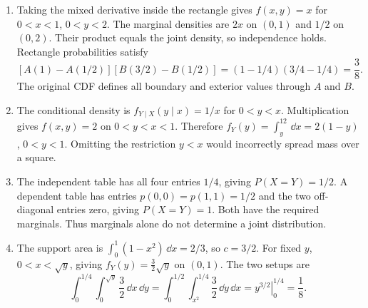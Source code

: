 \begin{enumerate}[label=\textbf{A\arabic*.},leftmargin=*,itemsep=1em]
\[=\frac43\int_0^1y^2\,\dd y=\frac49.
\]
The reversed setup is $\int_0^1\int_x^1\frac23(2x+y)\,\dd y\,\dd x$.
\item Taking the mixed derivative inside the rectangle gives $f(x,y)=x$ for $0<x<1$, $0<y<2$. The marginal densities are $2x$ on $(0,1)$ and $1/2$ on $(0,2)$. Their product equals the joint density, so independence holds. Rectangle probabilities satisfy
\[
[A(1)-A(1/2)][B(3/2)-B(1/2)]=(1-1/4)(3/4-1/4)=\frac38.
\]
The original CDF defines all boundary and exterior values through $A$ and $B$.
\item The conditional density is $f_{Y\mid X}(y\mid x)=1/x$ for $0<y<x$. Multiplication gives $f(x,y)=2$ on $0<y<x<1$. Therefore $f_Y(y)=\int_y^12\,\dd x=2(1-y)$, $0<y<1$. Omitting the restriction $y<x$ would incorrectly spread mass over a square.
\item The independent table has all four entries $1/4$, giving $P(X=Y)=1/2$. A dependent table has entries $p(0,0)=p(1,1)=1/2$ and the two off-diagonal entries zero, giving $P(X=Y)=1$. Both have the required marginals. Thus marginals alone do not determine a joint distribution.
\item The support area is $\int_0^1(1-x^2)\,\dd x=2/3$, so $c=3/2$. For fixed $y$, $0<x<\sqrt y$, giving $f_Y(y)=\tfrac32\sqrt y$ on $(0,1)$. The two setups are
\[
\int_0^{1/4}\int_0^{\sqrt y}\frac32\,\dd x\,\dd y
=\int_0^{1/2}\int_{x^2}^{1/4}\frac32\,\dd y\,\dd x
=\left.y^{3/2}\right|_0^{1/4}=\frac18.
\]
\end{enumerate}

